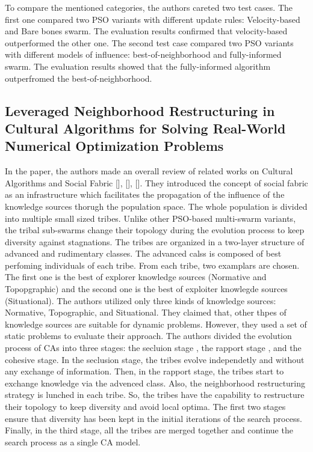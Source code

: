 To compare the mentioned categories, the authors careted two test cases. The first one compared two PSO variants with different update rules: Velocity-based and Bare bones swarm. The evaluation results confirmed that velocity-based outperformed the other one. The second test case compared two PSO variants with different models of influence: best-of-neighborhood and fully-informed swarm. The evaluation results showed that the fully-informed algorithm outperfromed the best-of-neighborhood.
\subsection{Leveraged Neighborhood Restructuring in Cultural Algorithms for Solving Real-World Numerical Optimization Problems}
In the paper, the authors made an overall review of related works on Cultural Algorithms and Social Fabric [], [], []. They introduced the concept of social fabric as an infrastructure which facilitates the propagation of the influence of the knowledge sources thorugh the population space. The whole population is divided into multiple small sized tribes. Unlike other PSO-based multi-swarm variants, the tribal sub-swarms change their topology during the evolution process to keep diversity against stagnations.\newline
The tribes are organized in a two-layer structure of advanced and rudimentary classes. The advanced calss is composed of best perfoming individuals of each tribe. From each tribe, two examplars are chosen. The first one is the best of explorer knowledge sources (Normative and Topopgraphic) and the second one is the best of exploiter knowlegde sources (Situational). The authors utilized only three kinds of knowledge sources: Normative, Topographic, and Situational. They claimed that, other thpes of knowledge sources are suitable for dynamic problems. However, they used a set of static problems to evaluate their approach. The authors divided the evolution process of CAs into three stages: the secluion stage , the rapport stage , and the cohesive stage. In the seclusion stage, the tribes evolve independetly and without any exchange of information. Then, in the rapport stage, the tribes start to exchange knowledge via the advenced class. Also, the neighborhood restructuring strategy is lunched in each tribe. So, the tribes have the capability to restructure their topology to keep diversity and avoid local optima. The first two stages ensure that diversity has been kept in the initial iterations of the search process. Finally, in the third stage, all the tribes are merged together and continue the search process as a single CA model. \newline
